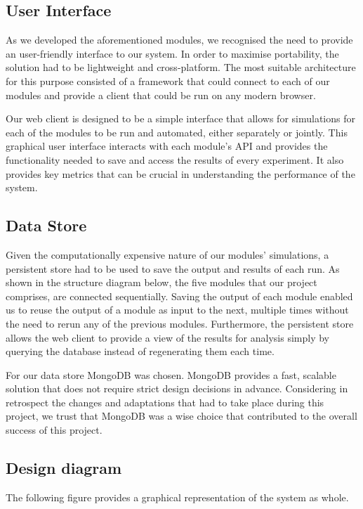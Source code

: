 \documentclass[a4paper,11pt]{article}
\begin{document}
\subsection{User Interface}
As we developed the aforementioned modules, we recognised the need to provide an user-friendly interface to our system. In order to maximise portability, the solution had to be lightweight and cross-platform. The most suitable architecture for this purpose consisted of a framework that could connect to each of our modules and provide a client that could be run on any modern browser.

Our web client is designed to be a simple interface that allows for simulations for each of the modules to be run and automated, either separately or jointly. This graphical user interface interacts with each module's API and provides the functionality needed to save and access the results of every experiment. It also provides key metrics that can be crucial in understanding the performance of the system.

\subsection{Data Store}

Given the computationally expensive nature of our modules' simulations, a persistent store had to be used to save the output and results of each run. As shown in the structure diagram below, the five modules that our project comprises, are connected sequentially. Saving the output of each module enabled us to reuse the output of a module as input to the next, multiple times without the need to rerun any of the previous modules. Furthermore, the persistent store allows the web client to provide a view of the results for analysis simply by querying the database instead of regenerating them each time.

For our data store MongoDB \cite{mdb} was chosen. MongoDB provides a fast, scalable solution that does not require strict design decisions in advance. Considering in retrospect the changes and adaptations that had to take place during this project, we trust that MongoDB was a wise choice that contributed to the overall success of this project.


\subsection{Design diagram}
The following figure provides a graphical representation of the system as whole. 
\end{document}
